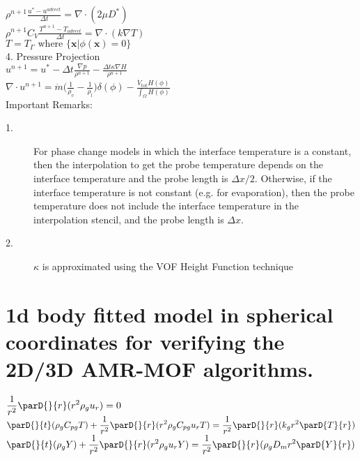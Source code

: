 \documentclass[]{article}
\begin{document}
\hspace*{20pt}\hspace*{20pt}$\rho^{n+1}\frac{u^*-u^{advect}}{\Delta t} = \nabla\cdot(2\mu D^*)$ \\
\hspace*{20pt}\hspace*{20pt}$\rho^{n+1}C_V\frac{ T^{n+1}-T_{advect}}{\Delta t} = \nabla\cdot(k \nabla T)$ \\
\hspace*{20pt}\hspace*{20pt}$T=T_\Gamma \textrm{ where } \{\bm{x}|\phi(\bm{x})=0\}$\\
{\color{blueaccent}4.} Pressure Projection\\
\hspace*{20pt}\hspace*{20pt}$u^{n+1} = u^* - \Delta t \frac{\nabla p}{\rho^{n+1}}-\frac{\Delta t \kappa \nabla H}{\rho^{n+1}}$\\
\hspace*{20pt}\hspace*{20pt}$\nabla\cdot u^{n+1} = \dot{m}\bigg(\frac{1}{\rho_v}-\frac{1}{\rho_l}\bigg)\delta(\phi) - \frac{\dot{V}_{\textrm{tot}} H(\phi)}{\int_{\Omega}H(\phi)}$\\
Important Remarks:
\begin{description}
\item[1.] For phase change models in which the interface 
  temperature is a constant, then the
  interpolation to get the probe temperature depends on the 
  interface temperature and the probe length is $\Delta x/2$.   
  Otherwise, if the interface temperature
  is not constant (e.g. for evaporation), then the
  probe temperature does not include the interface temperature in the
  interpolation stencil, and the probe length is $\Delta x$.
\item[2.]  
$\kappa$ is approximated using the VOF Height Function 
technique\cite{SUSSMAN2003}
\end{description}

	
\section*{1d body fitted model in spherical coordinates for
  verifying the 2D/3D AMR-MOF algorithms.} 
$\displaystyle \frac{1}{r^2}\parD{}{r}(r^2\rho_g u_r) = 0$\\
$\displaystyle \parD{}{t}(\rho_g C_{pg}T)+\frac{1}{r^2}\parD{}{r}(r^2 \rho_g C_{pg} u_r T) = \frac{1}{r^2}\parD{}{r}(k_g r^2 \parD{T}{r})$\\
$\displaystyle \parD{}{t}(\rho_g Y)+\frac{1}{r^2}\parD{}{r}(r^2 \rho_g  u_r Y) = \frac{1}{r^2}\parD{}{r}(\rho_g D_m r^2 \parD{Y}{r})$\\\\
\end{document}
